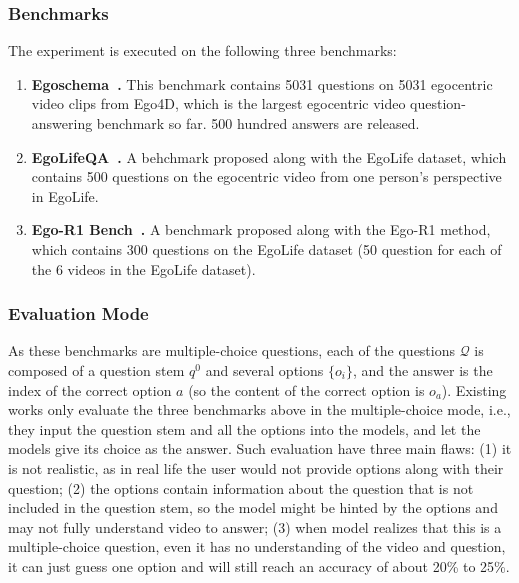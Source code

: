 \subsubsection{Benchmarks}

The experiment is executed on the following three benchmarks:

\begin{enumerate}
    \item \textbf{Egoschema~\cite{mangalam2023EgoSchema}. } This benchmark contains 5031 questions on 5031 egocentric video clips from Ego4D, which is the largest egocentric video question-answering benchmark so far. 500 hundred answers are released.
    \item \textbf{EgoLifeQA~\cite{yang2025EgoLife}. } A behchmark proposed along with the EgoLife dataset, which contains 500 questions on the egocentric video from one person's perspective in EgoLife.
    \item \textbf{Ego-R1 Bench~\cite{tian2025EgoR1}. } A benchmark proposed along with the Ego-R1 method, which contains 300 questions on the EgoLife dataset (50 question for each of the 6 videos in the EgoLife dataset).
\end{enumerate}

\subsubsection{Evaluation Mode}
As these benchmarks are multiple-choice questions, each of the questions $\mathcal{Q}$ is composed of a question stem $q^0$ and several options $\{o_i\}$, and the answer is the index of the correct option $a$ (so the content of the correct option is $o_a$).
Existing works only evaluate the three benchmarks above in the multiple-choice mode, i.e., they input the question stem and all the options into the models, and let the models give its choice as the answer.
Such evaluation have three main flaws: (1) it is not realistic, as in real life the user would not provide options along with their question;
(2) the options contain information about the question that is not included in the question stem, so the model might be hinted by the options and may not fully understand video to answer;
(3) when model realizes that this is a multiple-choice question, even it has no understanding of the video and question, it can just guess one option and will still reach an accuracy of about 20\% to 25\%.

